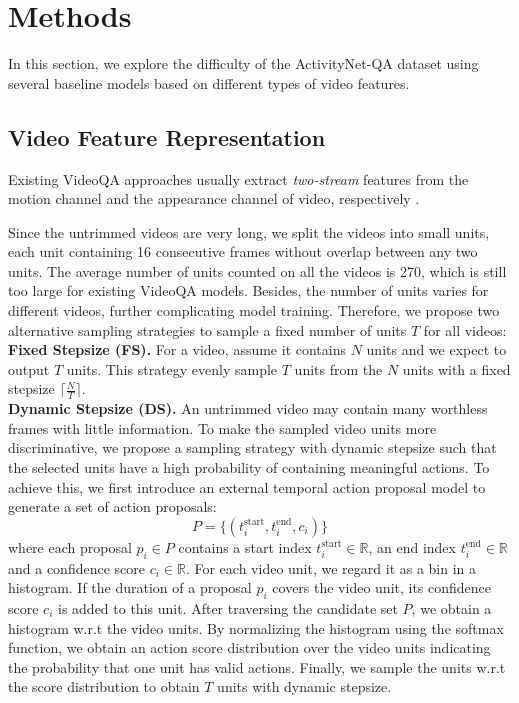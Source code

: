 \documentclass[letterpaper]{article} \usepackage{aaai19}  \usepackage{times}  \usepackage{helvet}  \usepackage{courier}  \usepackage{url}  \usepackage{graphicx}  \usepackage{amsfonts}
\begin{document}
\section{Methods}
In this section, we explore the difficulty of the ActivityNet-QA dataset using several baseline models based on different types of video features.

\subsection{Video Feature Representation}

Existing VideoQA approaches usually extract \emph{two-stream} features from the motion channel and the appearance channel of video, respectively \cite{xu2017video}.

Since the untrimmed videos are very long, we split the videos into small units, each unit containing 16 consecutive frames without overlap between any two units. The average number of units counted on all the videos is 270, which is still too large for existing VideoQA models. Besides, the number of units varies for different videos, further complicating model training. Therefore, we propose two alternative sampling strategies to sample a fixed number of units $T$ for all videos:
\\
\textbf{Fixed Stepsize (FS).} For a video, assume it contains $N$ units and we expect to output $T$ units. This strategy evenly sample $T$ units from the $N$ units with a fixed stepsize $\lceil\frac{N}{T}\rceil$.
\\
\textbf{Dynamic Stepsize (DS).} An untrimmed video may contain many worthless frames with little information. To make the sampled video units more discriminative, we propose a sampling strategy with dynamic stepsize such that the selected units have a high probability of containing meaningful actions. To achieve this, we first introduce an external temporal action proposal model \cite{caba2016fast} to generate a set of action proposals:
\begin{equation}
P=\{(t^{\mathrm{start}}_i, t^{\mathrm{end}}_i, c_i)\}
\end{equation}
where each proposal $p_i\in P$ contains a start index $t^{\mathrm{start}}_i\in\mathbb{R}$, an end index $t^{\mathrm{end}}_i\in\mathbb{R}$ and a confidence score $c_i\in\mathbb{R}$. For each video unit, we regard it as a bin in a histogram. If the duration of a proposal $p_i$ covers the video unit, its confidence score $c_i$ is added to this unit. After traversing the candidate set $P$, we obtain a histogram w.r.t the video units. By normalizing the histogram using the softmax function, we obtain an action score distribution over the video units indicating the probability that one unit has valid actions. Finally, we sample the units w.r.t the score distribution to obtain $T$ units with dynamic stepsize.
\end{document}
